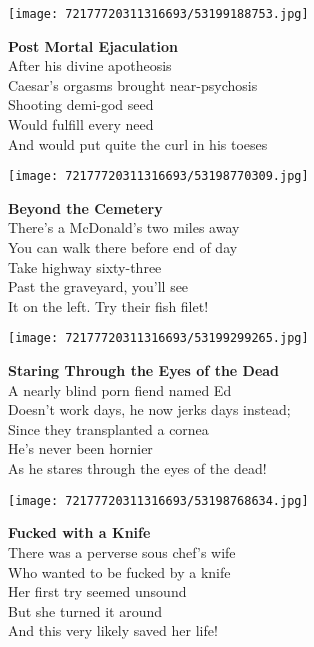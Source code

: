 \documentclass[10pt,letterpaper]{article}
\begin{document}
\begin{center}
\texttt{[image: 72177720311316693/53199188753.jpg]}
\end{center}

\begin{center}
\textbf{Post Mortal Ejaculation}\\
\vskip 0.2in
After his divine apotheosis\\
Caesar's orgasms brought near-psychosis\\
Shooting demi-god seed\\
Would fulfill every need\\
And would put quite the curl in his toeses\\
\end{center}
\pagebreak

\begin{center}\texttt{[image: 72177720311316693/53198770309.jpg]}
\end{center}
\begin{center}
\textbf{Beyond the Cemetery}\\
\vskip 0.2in
There's a McDonald's two miles away\\
You can walk there before end of day\\
Take highway sixty-three\\
Past the graveyard, you'll see\\
It on the left.  Try their fish filet!\\
\end{center}
\pagebreak

\begin{center}\texttt{[image: 72177720311316693/53199299265.jpg]}
\end{center}
\begin{center}
\textbf{Staring Through the Eyes of the Dead}\\
\vskip 0.2in
A nearly blind porn fiend named Ed\\
Doesn't work days, he now jerks days instead;\\
Since they transplanted a cornea\\
He's never been hornier\\
As he stares through the eyes of the dead!\\
\end{center}
\pagebreak

\begin{center}\texttt{[image: 72177720311316693/53198768634.jpg]}
\end{center}
\begin{center}
\textbf{Fucked with a Knife}\\
\vskip 0.2in
There was a perverse sous chef's wife\\
Who wanted to be fucked by a knife\\
Her first try seemed unsound\\
But she turned it around\\
And this very likely saved her life!\\
\end{center}
\pagebreak
\end{document}
